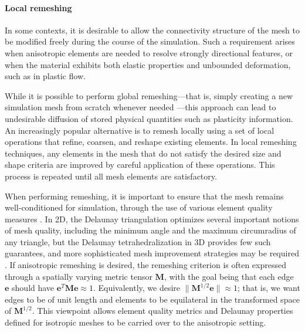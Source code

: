 \paragraph*{Local remeshing}
In some contexts, it is desirable to allow the connectivity structure of the mesh to be modified freely during the course of the simulation.
Such a requirement arises when anisotropic elements are needed to resolve strongly directional features, or when the material exhibits both elastic properties and unbounded deformation, such as in plastic flow.

While it is possible to perform global remeshing---that is, simply creating a new simulation mesh from scratch whenever needed \cite{Klingner2006,Bargteil2007}---this approach can lead to undesirable diffusion of stored physical quantities such as plasticity information.
An increasingly popular alternative is to remesh locally using a set of local operations that refine, coarsen, and reshape existing elements.
In local remeshing techniques, any elements in the mesh that do not satisfy the desired size and shape criteria are improved by careful application of these operations.
This process is repeated until all mesh elements are satisfactory.

When performing remeshing, it is important to ensure that the mesh remains well-conditioned for simulation, through the use of various element quality measures \cite{Shewchuk2002}.
In 2D, the Delaunay triangulation optimizes several important notions of mesh quality, including the minimum angle and the maximum circumradius of any triangle, but the Delaunay tetrahedralization in 3D provides few such guarantees, and more sophisticated mesh improvement strategies may be required \cite{Wicke2010}.
If anisotropic remeshing is desired, the remeshing criterion is often expressed through a spatially varying metric tensor $\mathbf M$, with the goal being that each edge $\mathbf e$ should have $\mathbf e^T\mathbf M\mathbf e\approx1$.
Equivalently, we desire $\|\mathbf M^{1/2}\mathbf e\|\approx1$; that is, we want edges to be of unit length and elements to be equilateral in the transformed space of $\mathbf M^{1/2}$.
This viewpoint allows element quality metrics and Delaunay properties defined for isotropic meshes to be carried over to the anisotropic setting.

